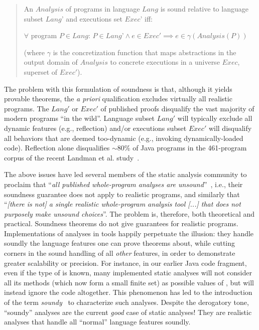 \begin{quote}
  An \(Analysis\) of programs in language \(Lang\) is sound relative to
  language subset \(Lang’\) and executions set \(Exec’\) iff:
  
  \tab \tab \(\forall\) program \(P \in Lang\): \(P \in Lang’ \land e \in Exec' \implies e \in \gamma(Analysis(P))\)
  
  (where \(\gamma\) is the concretization function that maps abstractions in the output domain of \(Analysis\) to concrete executions in a universe \(Exec\), superset of \(Exec'\)).
\end{quote}

The problem with this formulation of soundness is that, although it
yields provable theorems, the \emph{a priori} qualification
excludes virtually all realistic programs. The \(Lang'\) or \(Exec'\)
of published proofs disqualify the vast majority of modern programs
``in the wild''. Language subset \(Lang'\) will typically exclude all
dynamic features (e.g., reflection) and/or executions subset \(Exec'\)
will disqualify all behaviors that are deemed too-dynamic (e.g.,
invoking dynamically-loaded code).  Reflection alone disqualifies
$\sim$80\% of Java programs in the 461-program corpus of the recent
Landman et al. study~\cite{icse:2017:Landman}.

The above issues have led several members of
the static analysis community to proclaim that ``\emph{all published
  whole-program analyses are unsound}''~\cite{article:2015:Livshits}, i.e.,
their soundness guarantee does not apply to realistic programs, and
similarly that ``\emph{[there is not] a single realistic whole-program
  analysis tool [...] that does not purposely make unsound choices}''.
The problem is, therefore, both theoretical and practical. Soundness
theorems do not give guarantees for realistic
programs. Implementations of analyses in tools happily perpetuate the
illusion: they handle soundly the language features one can prove
theorems about, while cutting corners in the sound handling of all
\emph{other} features, in order to demonstrate greater scalability or
precision. For instance, in our earlier Java code fragment, even if
the type of  is known, many implemented static analyses will
not consider all its methods (which now form a small finite set) as
possible values of , but will instead ignore the code
altogether.  This phenomenon has led to the introduction of the term
\emph{soundy}~\cite{article:2015:Livshits} to characterize such analyses.
Despite the derogatory tone, ``soundy'' analyses are the current
\emph{good} case of static analyses! They are realistic analyses that
handle all ``normal'' language features soundly.

